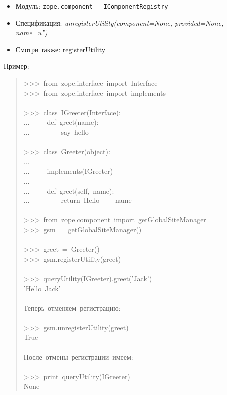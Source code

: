 \documentclass[a4paper,openany,twoside,final]{book}
\providecommand*{\DUroletitlereference}[1]{\textsl{#1}}
\begin{document}
\begin{itemize}

\item Модуль: \texttt{zope.component - IComponentRegistry}

\item Спецификация: \DUroletitlereference{unregisterUtility(component=None, provided=None,
name=u'')}

\item Смотри также: \hyperref[registerutility]{registerUtility}

\end{itemize}

Пример:

\begin{quote}{\ttfamily \raggedright \noindent
>{}>{}>~from~zope.interface~import~Interface\\
>{}>{}>~from~zope.interface~import~implements\\
~\\
>{}>{}>~class~IGreeter(Interface):\\
...~~~~~def~greet(name):\\
...~~~~~~~~~\textquotedbl{}say~hello\textquotedbl{}\\
~\\
>{}>{}>~class~Greeter(object):\\
...\\
...~~~~~implements(IGreeter)\\
...\\
...~~~~~def~greet(self,~name):\\
...~~~~~~~~~return~\textquotedbl{}Hello~\textquotedbl{}~+~name\\
~\\
>{}>{}>~from~zope.component~import~getGlobalSiteManager\\
>{}>{}>~gsm~=~getGlobalSiteManager()\\
~\\
>{}>{}>~greet~=~Greeter()\\
>{}>{}>~gsm.registerUtility(greet)\\
~\\
>{}>{}>~queryUtility(IGreeter).greet('Jack')\\
'Hello~Jack'\\
~\\
Теперь~отменяем~регистрацию:\\
~\\
>{}>{}>~gsm.unregisterUtility(greet)\\
True\\
~\\
После~отмены~регистрации~имеем:\\
~\\
>{}>{}>~print~queryUtility(IGreeter)\\
None
}
\end{quote}
\end{document}
